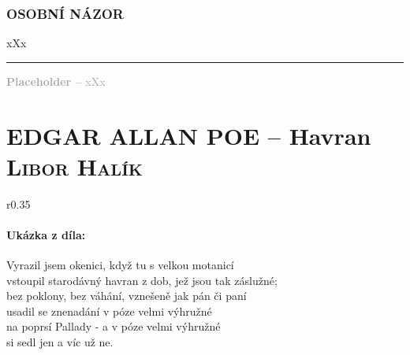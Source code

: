 \documentclass[A4paper]{extarticle} %
\begin{document}





\section*{OSOBNÍ NÁZOR}
\noindent 
xXx

\vfill

\noindent\begin{minipage}{\textwidth}
    \textcolor{darkgray}{\rule{\linewidth}{0.4pt}
    \footnotesize
    \textbf{Placeholder --} xXx
    }
\end{minipage}


\newpage


\changefontsize{7pt}

\part*{EDGAR ALLAN POE -- Havran {\hfill \normalfont\tiny\textsc{Libor Halík}}}

\noindent\begin{wrapfigure}{r}{0.35\textwidth}
\tiny

\subsection*{Ukázka z díla:}
\setlength{\parindent}{3pt}
\begin{center}
\noindent
Vyrazil jsem okenici, když tu s velkou motanicí \\
vstoupil starodávný havran z dob, jež jsou tak záslužné; \\
bez poklony, bez váhání, vznešeně jak pán či paní \\
usadil se znenadání v póze velmi výhružné \\
na poprsí Pallady - a v póze velmi výhružné \\
si sedl jen a víc už ne. 
\end{center}
\end{wrapfigure}
\end{document}
